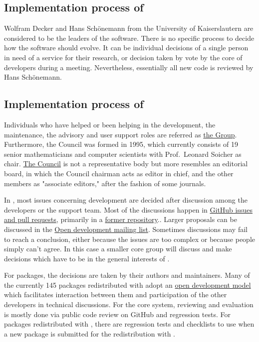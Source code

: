 \documentclass{deliverablereport}
\begin{document}
\subsection{Implementation process of \Singular}

Wolfram Decker and Hans Schönemann from the University of Kaiserslautern are considered to be the leaders of the \Singular software.
There is no specific process to decide how the software should evolve. It can be individual decisions of a single person in need of a service for their research, or decision taken by vote by the core of \Singular developers during a meeting.
Nevertheless, essentially all new code is reviewed by Hans Schönemann.

\subsection{Implementation process of \GAP}

Individuals who have helped or been helping in the development, the
maintenance, the advisory and user support roles are referred as
\href{https://www.gap-system.org/Contacts/People/people.html}{the \GAP
  Group}.  Furthermore, the \GAP Council was formed in 1995, which
currently consists of 19 senior mathematicians and computer
scientists with Prof.~Leonard Soicher as
chair. \href{https://www.gap-system.org/Contacts/People/Council/council.html}{The
  \GAP Council} is not a representative body but more resembles an
editorial board, in which the Council chairman acts as editor in
chief, and the other members as "associate editors," after
the fashion of some journals.

In \GAP, most issues concerning development are decided after
discussion among the developers or the support team. Most of the
discussions happen in \href{https://github.com/gap-system}{GitHub
  issues and pull requests}, primarily in a
\href{https://github.com/gap-system/gap}{former
  repository}.. Larger
proposals can be discussed in the
\href{http://mail.gap-system.org/mailman/listinfo/gap}{Open \GAP
  development mailing list}. Sometimes discussions may fail to reach a
conclusion, either because the issues are too complex or because
people simply can’t agree. In this case a smaller core group will
discuss and make decisions which have to be in the general interests
of \GAP.

For \GAP packages, the decisions are taken by their authors and
maintainers. Many of the currently 145 packages redistributed with \GAP
adopt an \href{http://gap-packages.github.io/}{open development model}
which facilitates interaction between them and participation of the
other \GAP developers in technical discussions.  For the
core \GAP system, reviewing and evaluation is mostly done via public
code review on GitHub and regression tests. For \GAP packages
redistributed with \GAP, there are regression tests and checklists to
use when a new package is submitted for the redistribution with \GAP.
\end{document}

